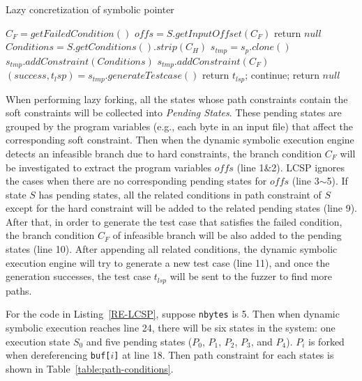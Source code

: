  

\begin{algorithm}
 \LinesNumbered
  \caption{Lazy concretization of symbolic pointer}
  \label{LCSP}
  $C_F = getFailedCondition()$\;
  $offs = S.getInputOffset(C_F)$\;
  {
    return $null$\;
  }
  $Conditions = S.getConditions().strip(C_H)$\;
  {
    $s_{tmp} = s_p.clone()$\;
    $s_{tmp}.addConstraint(Conditions)$\;
    $s_{tmp}.addConstraint(C_F)$\;
    $(success, t_lsp) = s_{tmp}.generateTestcase()$\;
    {
      return $t_{lsp}$;
    } {
      continue;
    }
  }
  return $null$\;
\end{algorithm}

When performing lazy forking, all the states whose path constraints 
contain the soft constraints will be collected into \emph{Pending States}. 
These pending states are grouped by the program variables (e.g., each 
byte in an input file) that affect the corresponding soft constraint. 
Then when the dynamic symbolic execution engine detects an infeasible 
branch due to hard constraints, the branch condition $C_F$ will be 
investigated to extract the program variables $offs$ (line 1\&2). 
LCSP ignores the cases when there are no corresponding pending 
states for $offs$ (line 3$\sim$5). 
If state $S$ has pending states, all the related conditions in path 
constraint of $S$ except for the hard constraint will be added to the 
related pending states (line 9).
After that, in order to generate the test case that satisfies the failed 
condition, the branch condition $C_F$ of infeasible branch will be also 
added to the pending states (line 10).
After appending all related conditions, the dynamic symbolic execution 
engine will try to generate a new test case (line 11), and once the 
generation successes, the test case $t_{lsp}$ will be sent to the 
fuzzer to find more paths.

For the code in Listing~\ref{RE-LCSP}, suppose \texttt{nbytes} is 5. 
Then when dynamic symbolic execution reaches line 24, there will be 
six states in the system: one execution state $S_0$ and five pending 
states ($P_0$, $P_1$, $P_2$, $P_3$, and $P_4$). $P_i$ is forked when 
dereferencing \texttt{buf[$i$]} at line 18.
Then path constraint for each states is shown in Table~\ref{table:path-conditions}.

